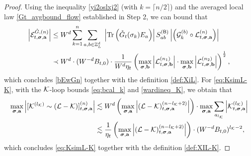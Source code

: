 \begin{proof}%
Using the inequality \eqref{yi2oslxj2} (with $k=\lceil n/2\rceil$) and the averaged local law \eqref{Gt_avgbound_flow} established in Step 2, we can bound that 
\begin{align*}
   \left|{\mathcal{E}^{{\mathring G},(n)}_{t, {\boldsymbol{\sigma}}, {\mathbf{a}}}}\right| &\le   {W}^d \sum_{k=1}^n \sum_{a, b\in {\mathbb Z}_L^d} \; 
 \left|{\operatorname{Tr}\left({ {\mathring G}_t(\sigma_k) E_{a} }\right)}\right|
   S^{({\mathsf{B}})}_{ab} 
  \left|{\left( {\mathcal{G}}^{(b)}_{k} \circ {\mathcal L}^{(n)}_{t, {\boldsymbol{\sigma}}, {\mathbf{a}}} \right)}\right| \\
 & \prec W^d\cdot (W^{-d}B_{t,0}) \cdot \frac{1}{W^d\eta_t} \left(\max_{{\boldsymbol{\sigma}},{\mathbf{b}}}  \left|{\mathcal L}^{(n_1)}_{t, {\boldsymbol{\sigma}}, {\mathbf{b}}}\right|\cdot \max_{{\boldsymbol{\sigma}},{\mathbf{b}}}  \left|{\mathcal L}^{(n_2)}_{t, {\boldsymbol{\sigma}}, {\mathbf{b}}}\right|\right)^{\frac 1 2},
  \end{align*}
which concludes \eqref{bEwGn} together with the definition \eqref{def:XiL}. For \eqref{eq:KsimL-K}, with the $\mathcal K$-loop bounds \eqref{eq:bcal_k} and \eqref{wardineq_K}, we obtain that 
 \begin{align*}
\max_{{\boldsymbol{\sigma}},{\mathbf{a}}}\left|{[\mathcal K^{(l_{\mathcal K})}\sim (\mathcal L-\mathcal K)]^{(n)}_{t,{\boldsymbol{\sigma}},{\mathbf{a}}}}\right| &\lesssim W^d \left({\max_{{\boldsymbol{\sigma}},{\mathbf{a}}}\left|{(\mathcal{L} - \mathcal{K})^{(n-l_{\mathcal K}+2)}_{t, {\boldsymbol{\sigma}}, {\mathbf{a}}}}\right|}\right) \cdot  \max_{{\boldsymbol{\sigma}},{\mathbf{a}}} \sum_{a_{l_{\mathcal K}}}\left|{\mathcal K^{(l_{\mathcal K})}_{t,{\boldsymbol{\sigma}},{\mathbf{a}}}}\right|    \\
&\lesssim \frac{1}{\eta_t}\left({\max_{{\boldsymbol{\sigma}},{\mathbf{a}}}\left|{(\mathcal{L} - \mathcal{K})^{(n-l_{\mathcal K}+2)}_{t, {\boldsymbol{\sigma}}, {\mathbf{a}}}}\right|}\right) \cdot (W^{-d}B_{t,0})^{l_{\mathcal K}-2} ,
\end{align*} 
which concludes \eqref{eq:KsimL-K} together with the definition \eqref{def:XIL-K}. 


\end{proof}

